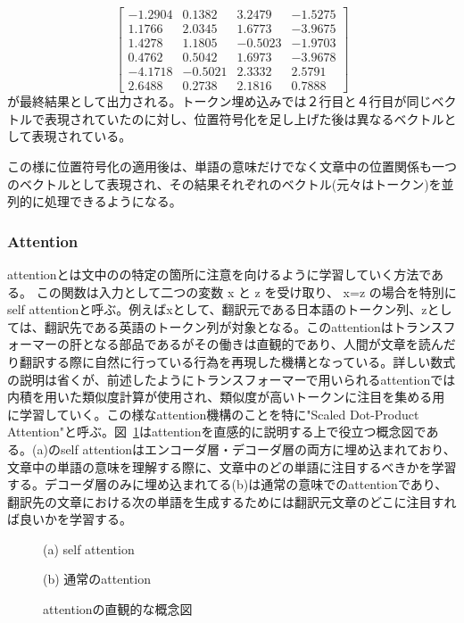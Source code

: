 \begin{enumerate}
\begin{equation*}
  \begin{bmatrix}
    -1.2904&  0.1382&  3.2479& -1.5275\\
     1.1766&  2.0345&  1.6773& -3.9675\\
     1.4278&  1.1805& -0.5023& -1.9703\\
     0.4762&  0.5042&  1.6973& -3.9678\\
    -4.1718& -0.5021&  2.3332&  2.5791\\
     2.6488&  0.2738&  2.1816&  0.7888
  \end{bmatrix}
\end{equation*}
が最終結果として出力される。トークン埋め込みでは２行目と４行目が同じベクトルで表現されていたのに対し、位置符号化を足し上げた後は異なるベクトルとして表現されている。
\end{enumerate}


この様に位置符号化の適用後は、単語の意味だけでなく文章中の位置関係も一つのベクトルとして表現され、その結果それぞれのベクトル(元々はトークン)を並列的に処理できるようになる。


\subsubsection{Attention}
attentionとは文中のの特定の箇所に注意を向けるように学習していく方法である。 この関数は入力として二つの変数 x と z を受け取り、 x=z の場合を特別にself attentionと呼ぶ。例えばxとして、翻訳元である日本語のトークン列、zとしては、翻訳先である英語のトークン列が対象となる。このattentionはトランスフォーマーの肝となる部品であるがその働きは直観的であり、人間が文章を読んだり翻訳する際に自然に行っている行為を再現した機構となっている。詳しい数式の説明は省くが、前述したようにトランスフォーマーで用いられるattentionでは内積を用いた類似度計算が使用され、類似度が高いトークンに注目を集める用に学習していく。この様なattention機構のことを特に"Scaled Dot-Product Attention"と呼ぶ。図~\ref{fig:att-abs}はattentionを直感的に説明する上で役立つ概念図である。(a)のself attentionはエンコーダ層・デコーダ層の両方に埋め込まれており、文章中の単語の意味を理解する際に、文章中のどの単語に注目するべきかを学習する。デコーダ層のみに埋め込まれてる(b)は通常の意味でのattentionであり、翻訳先の文章における次の単語を生成するためには翻訳元文章のどこに注目すれば良いかを学習する。


\begin{figure}
  \centering

    (a) self attention
    \vspace{5mm}

    (b) 通常のattention

  \caption{attentionの直観的な概念図}
\label{fig:att-abs}
\end{figure}



